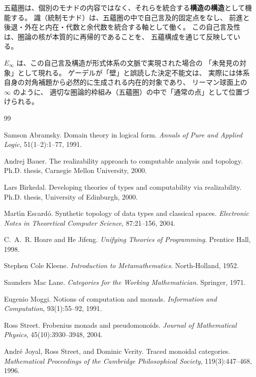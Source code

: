 \documentclass[11pt,a4paper]{article}
\theoremstyle{definition}
\newcommand{\Einf}{E_{\infty}}
\begin{document}
五蘊圏は、個別のモナドの内容ではなく、それらを統合する\textbf{構造の構造}として機能する。
識（統制モナド）は、五蘊圏の中で自己言及的固定点をなし、
前進と後退・外在と内在・代数と余代数を統合する軸として働く。
この自己言及性は、圏論の核が本質的に再帰的であることを、
五蘊構成を通じて反映している。

$\Einf$ は、この自己言及構造が形式体系の文脈で実現された場合の
「未発見の対象」として現れる。
ゲーデルが「壁」と誤読した決定不能文は、
実際には体系自身の対角補題から必然的に生成される内在的対象であり、
リーマン球面上の $\infty$ のように、
適切な圏論的枠組み（五蘊圏）の中で「通常の点」として位置づけられる。

\begin{thebibliography}{99}

Samson Abramsky.
\newblock Domain theory in logical form.
\newblock \emph{Annals of Pure and Applied Logic}, 51(1--2):1--77, 1991.

Andrej Bauer.
\newblock The realizability approach to computable analysis and topology.
\newblock Ph.D. thesis, Carnegie Mellon University, 2000.

Lars Birkedal.
\newblock Developing theories of types and computability via realizability.
\newblock Ph.D. thesis, University of Edinburgh, 2000.

Mart\'{\i}n Escard\'{o}.
\newblock Synthetic topology of data types and classical spaces.
\newblock \emph{Electronic Notes in Theoretical Computer Science}, 87:21--156, 2004.

C.~A.~R. Hoare and He Jifeng.
\newblock \emph{Unifying Theories of Programming}.
\newblock Prentice Hall, 1998.

Stephen Cole Kleene.
\newblock \emph{Introduction to Metamathematics}.
\newblock North-Holland, 1952.

Saunders Mac Lane.
\newblock \emph{Categories for the Working Mathematician}.
\newblock Springer, 1971.

Eugenio Moggi.
\newblock Notions of computation and monads.
\newblock \emph{Information and Computation}, 93(1):55--92, 1991.

Ross Street.
\newblock Frobenius monads and pseudomonoids.
\newblock \emph{Journal of Mathematical Physics}, 45(10):3930--3948, 2004.

Andr\'{e} Joyal, Ross Street, and Dominic Verity.
\newblock Traced monoidal categories.
\newblock \emph{Mathematical Proceedings of the Cambridge Philosophical Society},
  119(3):447--468, 1996.


\end{thebibliography}
\end{document}
